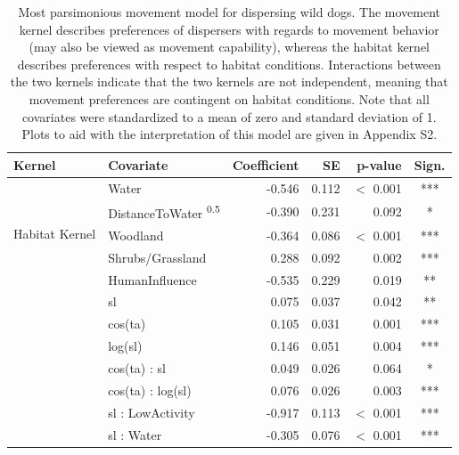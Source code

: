 \documentclass[abstract=off,10pt,a4paper,bibliography=totocnumbered]{article}
\begin{document}
\newpage
\begin{table}
  \begin{center}
  \caption{Most parsimonious movement model for dispersing wild dogs. The
  movement kernel describes preferences of dispersers with regards to movement
  behavior (may also be viewed as movement capability), whereas the habitat
  kernel describes preferences with respect to habitat conditions. Interactions
  between the two kernels indicate that the two kernels are not independent,
  meaning that movement preferences are contingent on habitat conditions. Note
  that all covariates were standardized to a mean of zero and standard deviation
  of 1. Plots to aid with the interpretation of this model are given in Appendix
  S2.}
  \label{MovementModelNumbers}
  \resizebox{\textwidth}{!} {
    \begin{threeparttable}
      \begin{tabular}{llrrrc}
        \toprule
        Kernel & Covariate & Coefficient & SE & p-value & Sign. \\
        \midrule
        \multirow{5}{*}{Habitat Kernel}
         & Water & -0.546 & 0.112 & \(<\) 0.001 & *** \\
         & DistanceToWater \textsuperscript{0.5} & -0.390 & 0.231 & 0.092 & * \\
         & Woodland & -0.364 & 0.086 & \(<\) 0.001 & *** \\
         & Shrubs/Grassland & 0.288 & 0.092 & 0.002 & *** \\
         & HumanInfluence & -0.535 & 0.229 & 0.019 & ** \\
        \hdashline
        \multirow{6}{*}{Movement Kernel}
         & sl & 0.075 & 0.037 & 0.042 & ** \\
         & cos(ta) & 0.105 & 0.031 & 0.001 & *** \\
         & log(sl) & 0.146 & 0.051 & 0.004 & *** \\
         & cos(ta) : sl & 0.049 & 0.026 & 0.064 & * \\
         & cos(ta) : log(sl) & 0.076 & 0.026 & 0.003 & *** \\
         & sl : LowActivity & -0.917 & 0.113 & \(<\) 0.001 & *** \\
        \hdashline
        \multirow{5}{*}{Interactions}
         & sl : Water & -0.305 & 0.076 & \(<\) 0.001 & *** \\

\end{tabular}
\end{threeparttable}}
\end{center}
\end{table}
\end{document}
